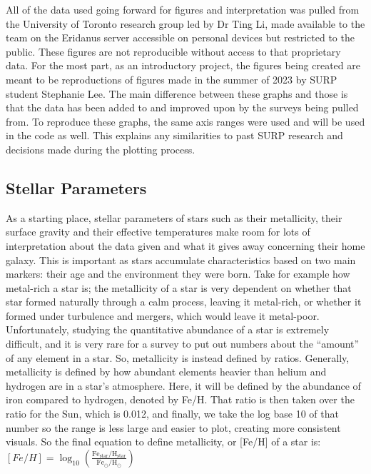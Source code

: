 \documentclass{article}
\begin{document}
\indent All of the data used going forward for figures and interpretation was pulled from the University of Toronto research group led by Dr Ting Li, made available to the team on the Eridanus server accessible on personal devices but restricted to the public. These figures are not reproducible without access to that proprietary data. For the most part, as an introductory project, the figures being created are meant to be reproductions of figures made in the summer of 2023 by SURP student Stephanie Lee. The main difference between these graphs and those is that the data has been added to and improved upon by the surveys being pulled from. To reproduce these graphs, the same axis ranges were used and will be used in the code as well. This explains any similarities to past SURP research and decisions made during the plotting process.\\

\subsection*{Stellar Parameters}
\indent As a starting place, stellar parameters of stars such as their metallicity, their surface gravity and their effective temperatures make room for lots of interpretation about the data given and what it gives away concerning their home galaxy. This is important as stars accumulate characteristics based on two main markers: their age and the environment they were born. Take for example how metal-rich a star is; the metallicity of a star is very dependent on whether that star formed naturally through a calm process, leaving it metal-rich, or whether it formed under turbulence and mergers, which would leave it metal-poor. Unfortunately, studying the quantitative abundance of a star is extremely difficult, and it is very rare for a survey to put out numbers about the “amount” of any element in a star. So, metallicity is instead defined by ratios. Generally, metallicity is defined by how abundant elements heavier than helium and hydrogen are in a star's atmosphere. Here, it will be defined by the abundance of iron compared to hydrogen, denoted by Fe/H. That ratio is then taken over the ratio for the Sun, which is 0.012, and finally, we take the log base 10 of that number so the range is less large and easier to plot, creating more consistent visuals. So the final equation to define metallicity, or [Fe/H] of a star is:\\

$[Fe/H] = \log_{10} \left( \frac{{\text{Fe}_{\text{star}} / \text{H}_{\text{star}}}}{{\text{Fe}_{\odot} / \text{H}_{\odot}}} \right)
$\\
\end{document}
